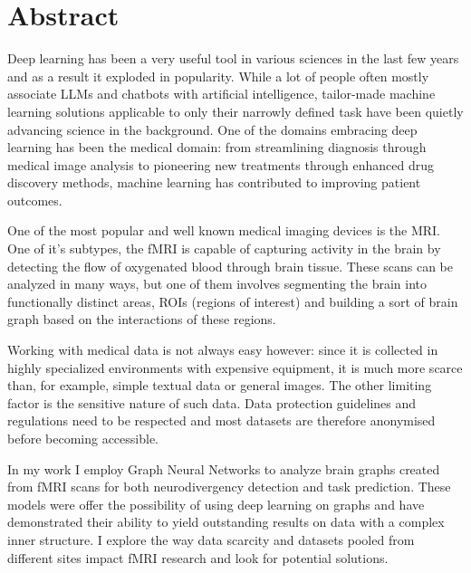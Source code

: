 \vfill
\selectenglish


\chapter*{Abstract}

Deep learning has been a very useful tool in various sciences in the last few years and as a result it exploded in popularity. While a lot of people often mostly associate LLMs and chatbots with artificial intelligence, tailor-made machine learning solutions applicable to only their narrowly defined task have been quietly advancing science in the background. One of the domains embracing deep learning has been the medical domain: from streamlining diagnosis through medical image analysis to pioneering new treatments through enhanced drug discovery methods, machine learning has contributed to improving patient outcomes.

One of the most popular and well known medical imaging devices is the MRI. One of it's subtypes, the fMRI is capable of capturing activity in the brain by detecting the flow of oxygenated blood through brain tissue. These scans can be analyzed in many ways, but one of them involves segmenting the brain into functionally distinct areas, ROIs (regions of interest) and building a sort of brain graph based on the interactions of these regions. 

Working with medical data is not always easy however: since it is collected in highly specialized environments with expensive equipment, it is much more scarce than, for example, simple textual data or general images. The other limiting factor is the sensitive nature of such data. Data protection guidelines and regulations need to be respected and most datasets are therefore anonymised before becoming accessible.

In my work I employ Graph Neural Networks to analyze brain graphs created from fMRI scans for both neurodivergency detection and task prediction. These models were offer the possibility of using deep learning on graphs and have demonstrated their ability to yield outstanding results on data with a complex inner structure. I explore the way data scarcity and datasets pooled from different sites impact fMRI research and look for potential solutions.

\vfill
\selectthesislanguage

\setcounter{romanPage}{\value{page}}
